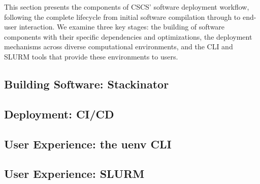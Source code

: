 This section presents the components of CSCS' software deployment workflow, following the complete lifecycle from initial software compilation through to end-user interaction.
We examine three key stages: the building of software components with their specific dependencies and optimizations, the deployment mechanisms across diverse computational environments, and the CLI and SLURM tools that provide these environments to users.

\subsection{Building Software: Stackinator}
\label{sec:stackinator}


\subsection{Deployment: CI/CD}
\label{sec:cicd}


\subsection{User Experience: the uenv CLI}
\label{sec:cli}


\subsection{User Experience: SLURM}
\label{sec:slurm}

